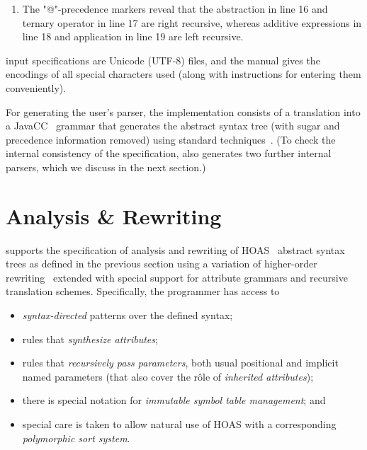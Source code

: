 \documentclass[letterpaper]{article}
\begin{document}
\begin{example}
\begin{enumerate}
  \item The "@"-precedence markers reveal that the abstraction in line 16 and ternary operator in
    line 17 are right recursive, whereas additive expressions in line 18 and application in line 19
    are left recursive.

  \end{enumerate}
  \HAX input specifications are Unicode (UTF-8) files, and the manual gives the encodings of all
  special characters used (along with instructions for entering them conveniently).
\end{example}

For generating the user's parser, the implementation consists of a translation into a
JavaCC~\cite{JavaCC} grammar that generates the abstract syntax tree (with sugar and precedence
information removed) using standard techniques~\cite{Aho+:2006}. (To check the internal consistency
of the specification, \HAX also generates two further internal parsers, which we discuss in the next
section.)


\section{Analysis \& Rewriting}
\label{sec:analysis}

\HAX supports the specification of analysis and rewriting of HOAS~\cite{PfenningElliot:pldi1988}
abstract syntax trees as defined in the previous section using a variation of higher-order
rewriting~\cite{Jouannaud:klop2005} extended with special support for attribute grammars and
recursive translation schemes.  Specifically, the programmer has access to
\begin{itemize}

\item \emph{syntax-directed} patterns over the defined syntax;

\item rules that \emph{synthesize attributes};

\item rules that \emph{recursively pass parameters}, both usual positional and implicit named
  parameters (that also cover the rôle of \emph{inherited attributes});

\item there is special notation for \emph{immutable symbol table management}; and

\item special care is taken to allow natural use of HOAS with a corresponding \emph{polymorphic sort
    system}.

\end{itemize}
\end{document}
